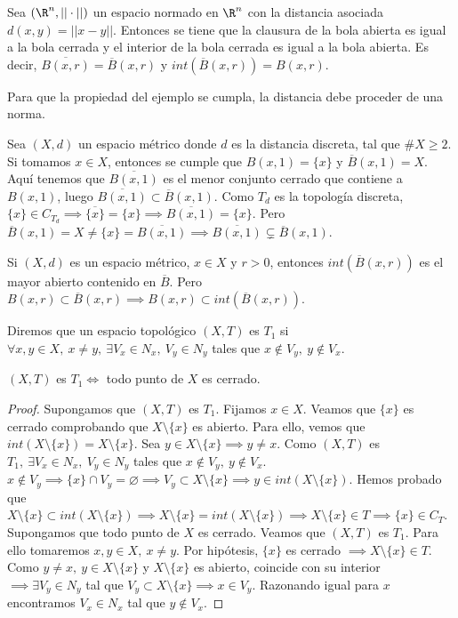 \begin{exmp}
  Sea $(\R^n, ||\cdot||)$ un espacio normado en $\R^n$ con la distancia asociada $d(x,y)=||x-y||$. Entonces se tiene que la clausura de la bola abierta es igual a la bola cerrada y el interior de la bola cerrada es igual a la bola abierta. Es decir, $\overline{B(x,r)}=\overline{B}(x,r)$ y $int(\overline{B}(x,r))=B(x,r)$.
\end{exmp}
Para que la propiedad del ejemplo se cumpla, la distancia debe proceder de una norma.
\begin{exmp}
  Sea $(X,d)$ un espacio métrico donde $d$ es la distancia discreta, tal que $\#X \ge 2$. Si tomamos $x \in X$, entonces se cumple que $B(x,1)=\{x\}$ y $\overline{B}(x,1)=X$. Aquí tenemos que $\overline{B(x,1)}$ es el menor conjunto cerrado que contiene a $B(x,1)$, luego $\overline{B(x,1)} \subset \overline{B}(x,1)$. Como $T_d$ es la topología discreta, $\{x\} \in C_{T_d} \implies \overline{\{x\}} = \{x\} \implies \overline{B(x,1)}=\{x\}$. Pero $\overline{B}(x,1)=X \neq \{x\} = \overline{B(x,1)} \implies \overline{B(x,1)} \subsetneq \overline{B}(x,1)$.
\end{exmp}
\begin{properties}
  Si $(X,d)$ es un espacio métrico, $x \in X$ y $r >0$, entonces $int(\overline{B}(x,r))$ es el mayor abierto contenido en $\overline{B}$. Pero $B(x,r) \subset \overline{B}(x,r) \implies B(x,r) \subset int(\overline{B}(x,r))$.
\end{properties}

\begin{ndef}[Separación]
  Diremos que un espacio topológico $(X,T)$ es $T_1$ si $\forall x,y \in X,\ x\neq y,\ \exists V_x \in N_x,\ V_y \in N_y$ tales que $x \not\in V_y,\ y \not\in V_x$.
\end{ndef}
\begin{properties}
  $(X,T)$ es $T_1 \Leftrightarrow$ todo punto de $X$ es cerrado.
\end{properties}
\begin{proof}
  \fbox{$\Rightarrow$} Supongamos que $(X,T)$ es $T_1$. Fijamos $x \in X$. Veamos que $\{x\}$ es cerrado comprobando que $X \setminus \{x\}$ es abierto. Para ello, vemos que $int(X \setminus \{x\})=X \setminus \{x\}$. Sea $y \in X \setminus \{x\} \implies y \neq x$. Como $(X,T)$ es $T_1,\ \exists V_x \in N_x,\ V_y \in N_y$ tales que $x \not\in V_y,\ y \not\in V_x$. $x \not\in V_y \implies \{x\} \cap V_y = \varnothing \implies V_y \subset X \setminus \{x\} \implies y \in int(X \setminus \{x\})$. Hemos probado que  $X \setminus \{x\} \subset int(X \setminus \{x\}) \implies X \setminus \{x\} = int(X \setminus \{x\}) \implies X \setminus \{x\} \in T \implies \{x\} \in C_T$. \\
  \fbox{$\Leftarrow$} Supongamos que todo punto de $X$ es cerrado. Veamos que $(X,T)$ es $T_1$. Para ello tomaremos $x,y \in X,\ x \neq y$. Por hipótesis, $\{x\}$ es cerrado $\implies X \setminus \{x\} \in T$. Como $y \neq x,\ y \in X \setminus \{x\}$ y $X \setminus \{x\}$ es abierto, coincide con su interior $\implies \exists V_y \in N_y$ tal que $V_y \subset X \setminus \{x\} \implies x \in V_y$. Razonando igual para $x$ encontramos $V_x \in N_x$ tal que $y \not\in  V_x$.
\end{proof}

